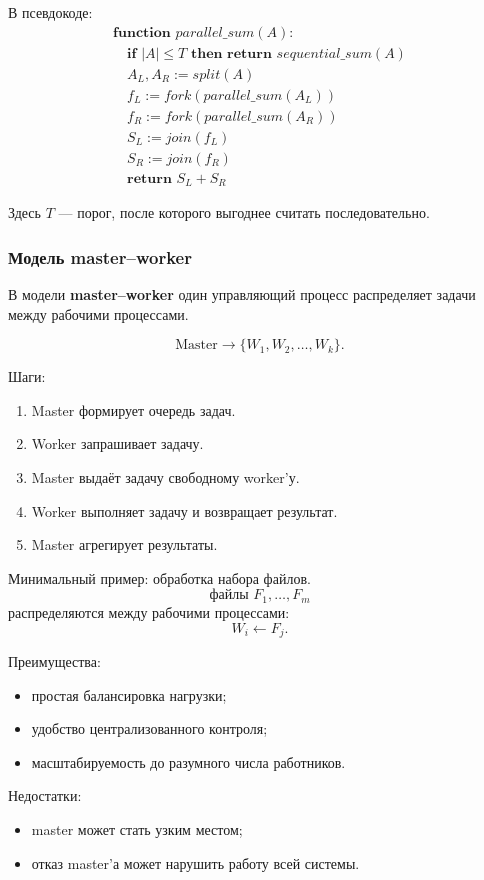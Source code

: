 \documentclass[12pt,a4paper]{article}
\begin{document}
В псевдокоде:
\[
\begin{array}{l}
\textbf{function } parallel\_sum(A):\\
\quad \textbf{if } |A| \leq T \textbf{ then return } sequential\_sum(A)\\
\quad A_L, A_R := split(A)\\
\quad f_L := fork(parallel\_sum(A_L))\\
\quad f_R := fork(parallel\_sum(A_R))\\
\quad S_L := join(f_L)\\
\quad S_R := join(f_R)\\
\quad \textbf{return } S_L + S_R
\end{array}
\]

Здесь $T$ --- порог, после которого выгоднее считать последовательно.

\subsubsection{Модель master--worker}

В модели \textbf{master--worker} один управляющий процесс распределяет задачи между рабочими процессами.

\[
\text{Master} \rightarrow \{W_1, W_2, \ldots, W_k\}.
\]

Шаги:
\begin{enumerate}
    \item Master формирует очередь задач.
    \item Worker запрашивает задачу.
    \item Master выдаёт задачу свободному worker'у.
    \item Worker выполняет задачу и возвращает результат.
    \item Master агрегирует результаты.
\end{enumerate}

Минимальный пример: обработка набора файлов.
\[
\text{файлы } F_1,\ldots,F_m
\]
распределяются между рабочими процессами:
\[
W_i \leftarrow F_j.
\]

Преимущества:
\begin{itemize}
    \item простая балансировка нагрузки;
    \item удобство централизованного контроля;
    \item масштабируемость до разумного числа работников.
\end{itemize}

Недостатки:
\begin{itemize}
    \item master может стать узким местом;
    \item отказ master'а может нарушить работу всей системы.
\end{itemize}
\end{document}
